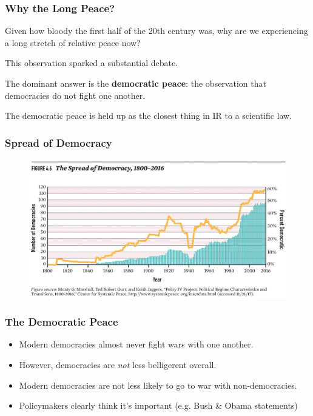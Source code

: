 \documentclass{beamer}
\begin{document}
\begin{frame} 
\frametitle{\LARGE{Why the Long Peace?}}
\begin{itemize}
	\large{
		\item Given how bloody the first half of the 20th century was, why are we experiencing a long stretch of relative peace now? \pause 
		\item This observation sparked a substantial debate. \pause 
        \item The dominant answer is the \textbf{democratic peace}: the observation that democracies do not fight one another. \pause 
	    \item The democratic peace is held up as the closest thing in IR to a scientific law.
	}
\end{itemize}
\end{frame}

\begin{frame} 
	\frametitle{\LARGE{Spread of Democracy}}
	\begin{figure}[ht!]
		\centering
		\includegraphics[width=\textwidth,height=0.8\textheight,keepaspectratio]{Demspread.jpg}
	\end{figure}
\end{frame}

\begin{frame} 
\frametitle{\LARGE{The Democratic Peace}}
\begin{itemize}
		\item Modern democracies almost never fight wars with one another. \pause 
		\item However, democracies are \emph{not} less belligerent overall. \pause 
		\item Modern democracies are not less likely to go to war with non-democracies. \pause
		\item Policymakers clearly think it's important (e.g. Bush \& Obama statements)
\end{itemize}
\end{frame}
\end{document}
